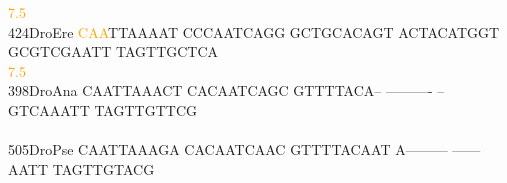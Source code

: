 \documentclass[11pt,twoside,reqno,a4paper]{article}
\begin{document}
{\hspace*{4\charwidth}\hspace*{7\charwidth}\hspace*{0\charwidth}\textcolor{orange}{7.5}\hspace*{1\charwidth}\hspace*{1\charwidth}\hspace*{1\charwidth}\hspace*{1\charwidth}\hspace*{1\charwidth}\hspace*{1\charwidth}\\
424\hspace*{1\charwidth}DroEre	\textcolor{orange}{C}\textcolor{orange}{A}\textcolor{orange}{A}TTAAAAT	CCCAATCAGG	GCTGCACAGT	ACTACATGGT	GCGTCGAATT	TAGTTGCTCA	\\
\hspace*{4\charwidth}\hspace*{7\charwidth}\hspace*{0\charwidth}\textcolor{orange}{7.5}\hspace*{1\charwidth}\hspace*{1\charwidth}\hspace*{1\charwidth}\hspace*{1\charwidth}\hspace*{1\charwidth}\hspace*{1\charwidth}\\
398\hspace*{1\charwidth}DroAna	CAATTAAACT	CACAATCAGC	GTTTTACA--	----------	--GTCAAATT	TAGTTGTTCG	\\
\hspace*{4\charwidth}\hspace*{7\charwidth}\hspace*{1\charwidth}\hspace*{1\charwidth}\hspace*{1\charwidth}\hspace*{1\charwidth}\hspace*{1\charwidth}\hspace*{1\charwidth}\\
505\hspace*{1\charwidth}DroPse	CAATTAAAGA	CACAATCAAC	GTTTTACAAT	A---------	------AATT	TAGTTGTACG	\\
\hspace*{4\charwidth}\hspace*{7\charwidth}\hspace*{1\charwidth}\hspace*{1\charwidth}\hspace*{1\charwidth}\hspace*{1\charwidth}\hspace*{1\charwidth}\hspace*{1\charwidth}\\
}
\end{document}
